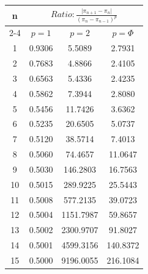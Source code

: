 \documentclass{article}
\providecommand{\abs}[1]{\lvert#1\rvert}
\begin{document}
\begin{tabular}{|c|c|c|c|}
\hline
\multirow{2}{*}{n} & \multicolumn{3}{|c|}{$Ratio:\displaystyle\frac{\abs{\pi_{n+1}-\pi_{n}}}{({\pi_{n}-\pi_{n-1}})^p}$} \\
\cline{2-4}
 & $p=1$ & $p=2$ & $p=\Phi$ \\
\hline
 1 & 0.9306 & 5.5089 & 2.7931 \\ 
  2 & 0.7683 & 4.8866 & 2.4105 \\ 
  3 & 0.6563 & 5.4336 & 2.4235 \\ 
  4 & 0.5862 & 7.3944 & 2.8080 \\ 
  5 & 0.5456 & 11.7426 & 3.6362 \\ 
  6 & 0.5235 & 20.6505 & 5.0737 \\ 
  7 & 0.5120 & 38.5714 & 7.4013 \\ 
  8 & 0.5060 & 74.4657 & 11.0647 \\ 
  9 & 0.5030 & 146.2803 & 16.7563 \\ 
 10 & 0.5015 & 289.9225 & 25.5443 \\ 
 11 & 0.5008 & 577.2135 & 39.0723 \\ 
 12 & 0.5004 & 1151.7987 & 59.8657 \\ 
 13 & 0.5002 & 2300.9707 & 91.8027 \\ 
 14 & 0.5001 & 4599.3156 & 140.8372 \\ 
 15 & 0.5000 & 9196.0055 & 216.1084 \\ 
 \hline 
\end{tabular}
\end{document}
